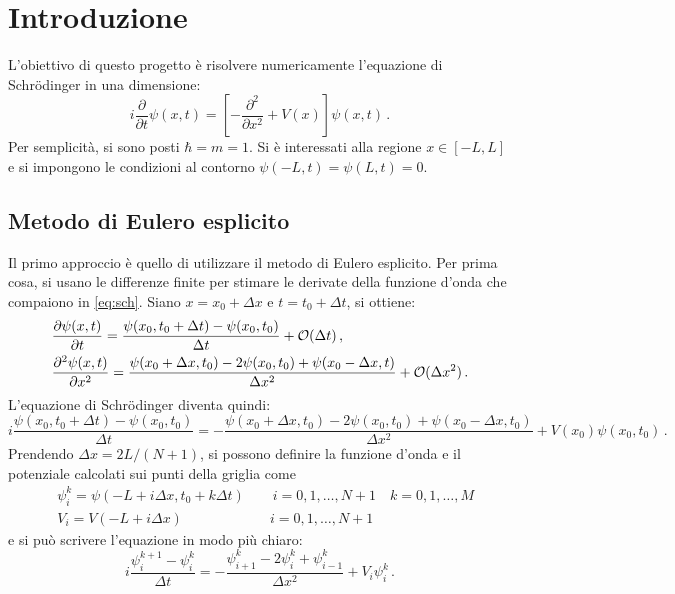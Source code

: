 \documentclass[a4paper, titlepage]{article}
\begin{document}

\newcommand{\sch}[0]{Schrödinger }

\section{Introduzione}
L'obiettivo di questo progetto è risolvere numericamente l'equazione di Schrödinger in una dimensione:
\begin{equation}
    i\frac{\partial}{\partial t}\psi(x,t) = \left[-\frac{\partial^2}{\partial x^2} + V(x)\right]\psi(x,t)\, .
    \label{eq:sch}
\end{equation}
Per semplicità, si sono posti $\hbar = m = 1$. Si è interessati alla regione $x \in [-L,L]$ e si impongono le condizioni al contorno $\psi(-L,t) = \psi(L,t) = 0$.

\subsection{Metodo di Eulero esplicito}
Il primo approccio è quello di utilizzare il metodo di Eulero esplicito. 
Per prima cosa, si usano le differenze finite per stimare le derivate della funzione d'onda che compaiono in \eqref{eq:sch}. Siano $x = x_0 + \Delta x$ e $t = t_0 + \Delta t$, si ottiene:
\begin{align*}
    &\pdv{\psi(x, t)}{t} = \frac{\psi(x_0, t_0 + \Delta t) - \psi(x_0, t_0)}{\Delta t} + \mathcal{O}(\Delta t)\, , \\
    &\pdv[2]{\psi(x, t)}{x} = \frac{\psi(x_0 + \Delta x, t_0) - 2\psi(x_0, t_0) + \psi(x_0 - \Delta x, t)}{\Delta x^2} + \mathcal{O}(\Delta x^2)\, .
\end{align*}
L'equazione di Schrödinger diventa quindi:
\begin{equation*}
    i \frac{\psi(x_0, t_0 + \Delta t) - \psi(x_0, t_0)}{\Delta t} = 
    - \frac{\psi(x_0 + \Delta x, t_0) - 2\psi(x_0, t_0) + \psi(x_0 - \Delta x, t_0)}{\Delta x^2} + V(x_0)\psi(x_0, t_0)\, .
\end{equation*}
Prendendo $\Delta x = 2L/(N+1)$, si possono definire la funzione d'onda e il potenziale calcolati sui punti della griglia come
\begin{align*}
    &\psi_i^k = \psi(-L + i\Delta x, t_0 + k\Delta t) \qquad i = 0,1,\dots,N+1 \quad k = 0,1,\dots,M \\
    &V_i = V(-L + i\Delta x) \qquad\qquad\qquad\ i = 0,1,\dots,N+1
\end{align*}
e si può scrivere l'equazione in modo più chiaro:
\begin{equation*}
    i \frac{\psi_i^{k+1} - \psi_i^k}{\Delta t} = 
    - \frac{\psi_{i+1}^k - 2\psi_i^k + \psi_{i-1}^k}{\Delta x^2} + V_i\psi_i^k\, .
\end{equation*}
\end{document}

